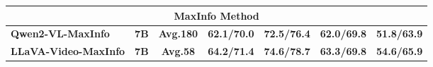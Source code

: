\begin{table*}[h]
\begin{center}
\begin{small}
\begin{sc}
{\begin{tabular}{lcccccc}
\midrule
\multicolumn{7}{c}{\textbf{MaxInfo Method}} \\
\midrule
\textbf{Qwen2-VL-MaxInfo} & \textbf{7B} & \textbf{Avg.180} & \textbf{62.1/70.0} & \textbf{72.5/76.4} & \textbf{62.0/69.8} & \textbf{51.8/63.9} \\
\textbf{LLaVA-Video-MaxInfo} & \textbf{7B} & \textbf{Avg.58} & \textbf{64.2/71.4} & \textbf{74.6/78.7} & \textbf{63.3/69.8} & \textbf{54.6/65.9}\\

\bottomrule
\end{tabular}}
\end{sc}
\end{small}
\end{center}
\vskip -0.1in
\end{table*}